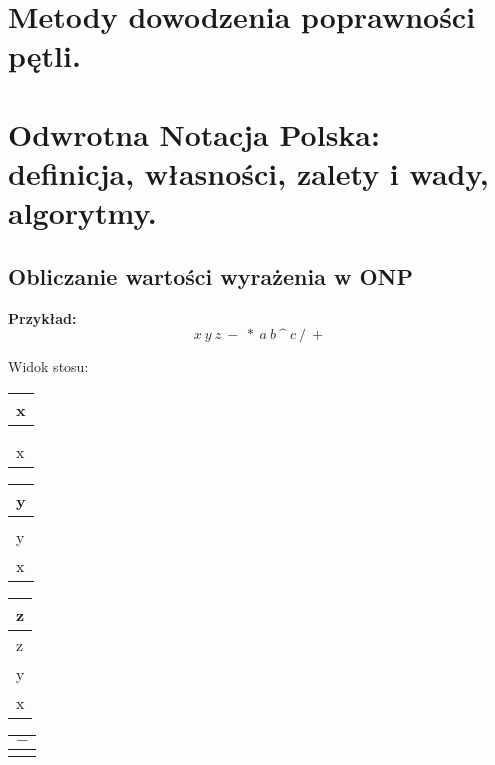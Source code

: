 \documentclass[main.tex]{subfiles}
\begin{document}
    \section{Metody dowodzenia poprawności pętli.}
    \section{Odwrotna Notacja Polska: definicja, własności, zalety i wady, algorytmy.}

    \subsection{Obliczanie wartości wyrażenia w ONP}
    \textbf{Przykład:}
    \[x ~ y ~ z ~ - ~ * ~ a ~ b ~ \text{\textasciicircum} ~ c ~ / ~ +\]

    Widok stosu:
    \begin{table}[H]
        \begin{tabular}{|p{2cm}|}
            \hline
            \textbf{x}\\
            \hline
            \hline
            \\
            \hline
            \\
            \hline
            x \\
            \hline
        \end{tabular}
        \begin{tabular}{|p{2cm}|}
            \hline
            \textbf{y}\\
            \hline
            \hline
            \\
            \hline
            y \\
            \hline
            x \\
            \hline
        \end{tabular}
        \begin{tabular}{|p{2cm}|}
            \hline
            \textbf{z}\\
            \hline
            \hline
            z \\
            \hline
            y \\
            \hline
            x \\
            \hline
        \end{tabular}
        \begin{tabular}{|p{2cm}|}
            \hline
            $\boldsymbol{-}$\\
            \hline
            \hline
            \\

\end{tabular}
\end{table}
\end{document}

